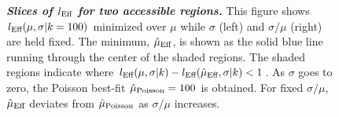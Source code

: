 \documentclass[a4paper, 11pt]{article}
\newcommand{\lmc}{l_\textmd{Eff}}
\newcommand{\hatmu}{\hat{\mu}}
\newcommand{\hatpoisson}{\hatmu_\textmd{Poisson}}
\newcommand{\hatmc}{\hatmu_\textmd{Eff}}
\begin{document}
\begin{figure}[htp]
\centering
\centering
\caption{\textbf{\textit{Slices of $\lmc$ for two accessible regions.}} This figure shows $\lmc(\mu, \sigma|k=100)$ minimized over $\mu$ while $\sigma$ (left) and $\sigma/\mu$ (right) are held fixed. The minimum, $\hatmc$, is shown as the solid blue line running through the center of the shaded regions. The shaded regions indicate where $\lmc(\mu, \sigma|k) - \lmc(\hatmc, \sigma|k) < 1$. As $\sigma$ goes to zero, the Poisson best-fit $\hatpoisson=100$ is obtained. For fixed $\sigma/\mu$, $\hatmc$ deviates from $\hatpoisson$ as $\sigma/\mu$ increases.}
\label{fig:llhmin}
\end{figure}
\end{document}
